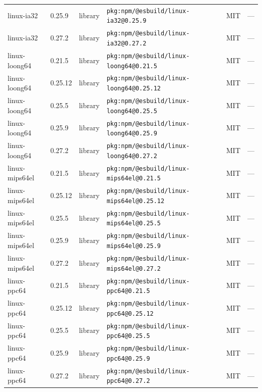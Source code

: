 \documentclass[11pt,a4paper]{article}
\begin{document}
\begin{longtable}{|p{4cm}|p{2cm}|p{1.6cm}|p{5cm}|p{1.5cm}|p{3.5cm}|}
\raggedright linux-ia32 & 0.25.9 & library & \small\texttt{pkg:npm/@esbuild/linux-ia32@0.25.9} & MIT & \small — \\
\raggedright linux-ia32 & 0.27.2 & library & \small\texttt{pkg:npm/@esbuild/linux-ia32@0.27.2} & MIT & \small — \\
\raggedright linux-loong64 & 0.21.5 & library & \small\texttt{pkg:npm/@esbuild/linux-loong64@0.21.5} & MIT & \small — \\
\raggedright linux-loong64 & 0.25.12 & library & \small\texttt{pkg:npm/@esbuild/linux-loong64@0.25.12} & MIT & \small — \\
\raggedright linux-loong64 & 0.25.5 & library & \small\texttt{pkg:npm/@esbuild/linux-loong64@0.25.5} & MIT & \small — \\
\raggedright linux-loong64 & 0.25.9 & library & \small\texttt{pkg:npm/@esbuild/linux-loong64@0.25.9} & MIT & \small — \\
\raggedright linux-loong64 & 0.27.2 & library & \small\texttt{pkg:npm/@esbuild/linux-loong64@0.27.2} & MIT & \small — \\
\raggedright linux-mips64el & 0.21.5 & library & \small\texttt{pkg:npm/@esbuild/linux-mips64el@0.21.5} & MIT & \small — \\
\raggedright linux-mips64el & 0.25.12 & library & \small\texttt{pkg:npm/@esbuild/linux-mips64el@0.25.12} & MIT & \small — \\
\raggedright linux-mips64el & 0.25.5 & library & \small\texttt{pkg:npm/@esbuild/linux-mips64el@0.25.5} & MIT & \small — \\
\raggedright linux-mips64el & 0.25.9 & library & \small\texttt{pkg:npm/@esbuild/linux-mips64el@0.25.9} & MIT & \small — \\
\raggedright linux-mips64el & 0.27.2 & library & \small\texttt{pkg:npm/@esbuild/linux-mips64el@0.27.2} & MIT & \small — \\
\raggedright linux-ppc64 & 0.21.5 & library & \small\texttt{pkg:npm/@esbuild/linux-ppc64@0.21.5} & MIT & \small — \\
\raggedright linux-ppc64 & 0.25.12 & library & \small\texttt{pkg:npm/@esbuild/linux-ppc64@0.25.12} & MIT & \small — \\
\raggedright linux-ppc64 & 0.25.5 & library & \small\texttt{pkg:npm/@esbuild/linux-ppc64@0.25.5} & MIT & \small — \\
\raggedright linux-ppc64 & 0.25.9 & library & \small\texttt{pkg:npm/@esbuild/linux-ppc64@0.25.9} & MIT & \small — \\
\raggedright linux-ppc64 & 0.27.2 & library & \small\texttt{pkg:npm/@esbuild/linux-ppc64@0.27.2} & MIT & \small — \\

\end{longtable}
\end{document}
